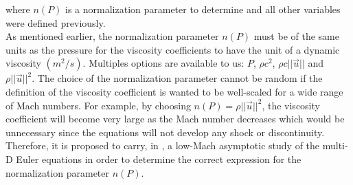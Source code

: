 where $n(P)$ is a normalization parameter to determine and all other variables were defined previously. \\
As mentioned earlier, the normalization parameter $n(P)$ must be of the same units as the pressure for the viscosity coefficients to have the unit of a dynamic viscosity $(m^2 / s)$. Multiples options are available to us: $P$, $\rho c^2$, $\rho c || \vec{u} ||$ and $\rho || \vec{u} ||^2$. The choice of the normalization parameter cannot be random if the definition of the viscosity coefficient is wanted to be well-scaled for a wide range of Mach numbers. For example, by choosing $n(P) = \rho || \vec{u} ||^2$, the viscosity coefficient will become very large as the Mach number decreases which would be unnecessary since the equations will not develop any shock or discontinuity. Therefore, it is proposed to carry, in , a low-Mach asymptotic study of the multi-D Euler equations in order to determine the correct expression for the normalization parameter $n(P)$.
